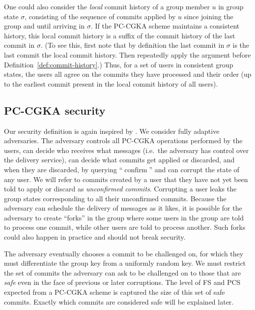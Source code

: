 One could also consider the \emph{local} commit history of a group member $u$ in group state $\sigma$, consisting of the sequence of commits applied by $u$ since joining the group and until arriving in $\sigma$. If the PC-CGKA scheme maintains a consistent history, this local commit history is a suffix of the commit history of the last commit in $\sigma$. (To see this, first note that by definition the last commit in $\sigma$ is the last commit the local commit history. Then repeatedly apply the argument before Definition~\ref{def:commit-history}.) Thus, for a set of users in consistent group states, the users all agree on the commits they have processed and their order (up to the earliest commit present in the local commit history of all users).

\subsection{PC-CGKA security}


Our security definition is again inspired by \cite{ttkem}. We consider fully adaptive adversaries. The adversary controls all PC-CGKA operations performed by the users, can decide who receives what messages (i.e.\ the adversary has control over the delivery service), can decide what commits get applied or discarded, and when they are discarded, by querying ``$\operatorname{confirm}$'' and can corrupt the state of any user. We will refer to commits created by a user that they have not yet been told to apply or discard as \emph{unconfirmed commits}. Corrupting a user leaks the group states corresponding to all their unconfirmed commits. Because the adversary can schedule the delivery of messages as it likes, it is possible for the adversary to create ``forks'' in the group where some users in the group are told to process one commit, while other users are told to process another. Such forks could also happen in practice and should not break security.

The adversary eventually chooses a commit to be challenged on, for which they must differentiate the group key from a uniformly random key. We must restrict the set of commits the adversary can ask to be challenged on to those that are \emph{safe} even in the face of previous or later corruptions. The level of FS and PCS expected from a PC-CGKA scheme is captured the size of this set of safe commits. Exactly which commits are considered safe will be explained later.

